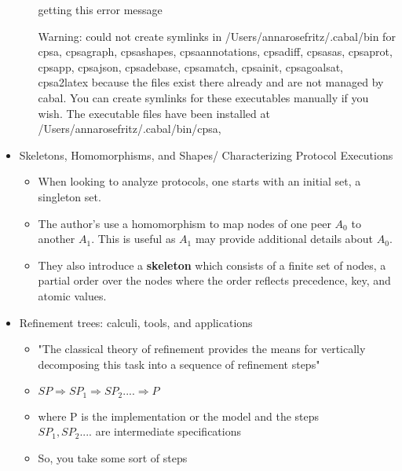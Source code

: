 \documentclass[12pt, letterpaper]{article}
\begin{document}
\begin{itemize}
\begin{itemize}
        getting this error message 
        
        Warning: could not create symlinks in /Users/annarosefritz/.cabal/bin for
        cpsa, cpsagraph, cpsashapes, cpsaannotations, cpsadiff, cpsasas, cpsaprot,
        cpsapp, cpsajson, cpsadebase, cpsamatch, cpsainit, cpsagoalsat, cpsa2latex
        because the files exist there already and are not managed by cabal. You can
        create symlinks for these executables manually if you wish. The executable
        files have been installed at /Users/annarosefritz/.cabal/bin/cpsa, 
    \end{itemize}
    \item Skeletons, Homomorphisms, and Shapes/ Characterizing Protocol Executions
    \begin{itemize}
        \item When looking to analyze protocols, one starts with an initial set, a singleton set. 
        \item The author's use a homomorphism to map nodes of one peer $A_0$ to another $A_1$. This is useful as $A_1$ may provide additional details about $A_0$.
        \item They also introduce a \textbf{skeleton} which consists of a finite set of nodes, a partial order over the nodes where the order reflects precedence, key, and atomic values.   
    \end{itemize}
    \item Refinement trees: calculi, tools, and applications
    \begin{itemize}
        \item "The classical theory of refinement provides the means for vertically decomposing this task into a sequence of refinement steps" 
        \item $SP \Rightarrow SP_1 \Rightarrow SP_2 .... \Rightarrow P$
        \item where P is the implementation or the model and the steps \\ $SP_1, SP_2....$ are intermediate specifications
        \item So, you take some sort of steps 
    \end{itemize}
\end{itemize}
\end{document}
